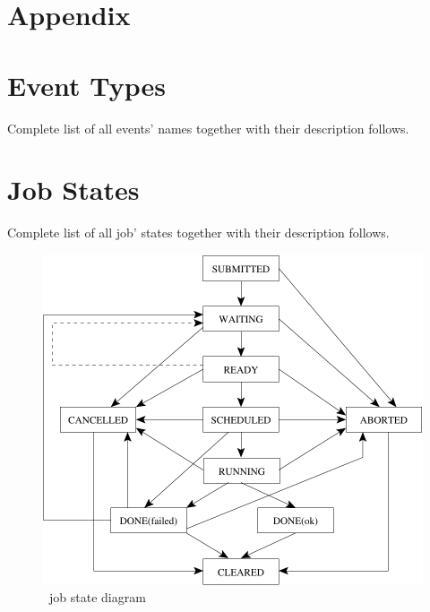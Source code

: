 %
%
%
%
\section*{Appendix}

\section{\LB Event Types}
\label{a:events}
Complete list of all events' names together with their description follows.


\newpage
\section{\LB Job States}
\label{a:jobstat}
Complete list of all job' states together with their description follows.


\begin{figure}[h]
\centering
\includegraphics[width=.6\hsize]{images/wms2-jobstat}
\caption{\LB\ job state diagram}
\end{figure}


